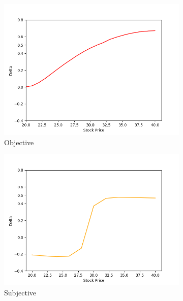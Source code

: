 \vspace*{15pt}
\begin{figure}[H]
    \centering
    \begin{subfigure}{0.32\textwidth}
        \centering
        \includegraphics[width=\textwidth]{fig/4/r_delta_obj.png}
        \caption{Objective}
        \label{fig:r_delta_obj}
    \end{subfigure}
    \hfill
    \begin{subfigure}{0.32\textwidth}
        \centering
        \includegraphics[width=\textwidth]{fig/4/r_delta_subj.png}
        \caption{Subjective}
        \label{fig:r_delta_subj}
    \end{subfigure}
    \hfill
    \begin{subfigure}{0.32\textwidth}

\end{subfigure}
\end{figure}
